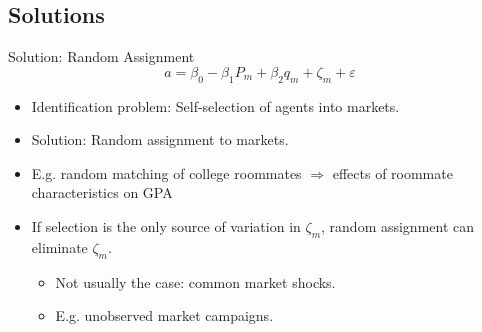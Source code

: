 \documentclass[aspectratio=169]{beamer}  %
\begin{document}
\subsection{Solutions}
\begin{frame}{Solution: Random Assignment}
    $$ a = \beta_0 - \beta_1P_m + \beta_2q_m + \zeta_m + \varepsilon $$
    \vspace{-0.2cm}
    \begin{itemize}
        \item Identification problem: Self-selection of agents into markets.
        \item Solution: Random assignment to markets.

        \item E.g. random matching of college roommates $\Rightarrow$ effects of roommate characteristics on GPA
        \item If selection is the only source of variation in $\zeta_m$, random assignment can eliminate $\zeta_m$. 
        \begin{itemize}
            \item Not usually the case: common market shocks.
            \item E.g. unobserved market campaigns.
        \end{itemize}
    \end{itemize}

\end{frame}
\end{document}
